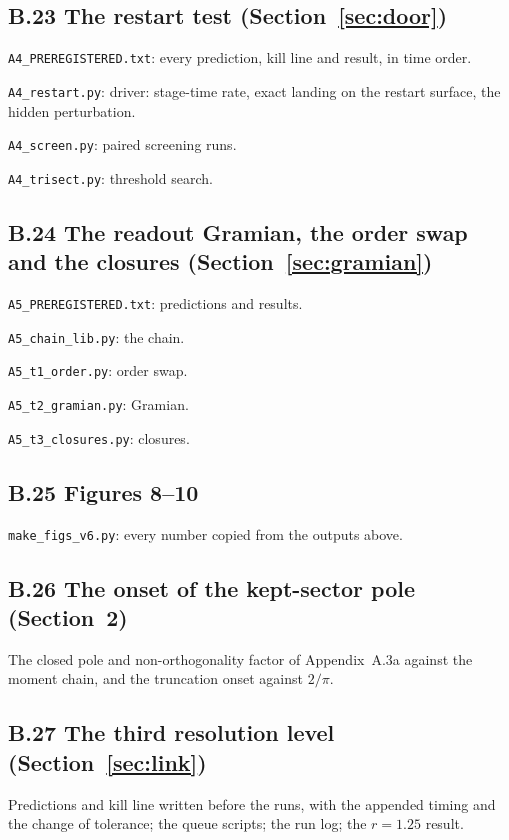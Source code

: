 \subsection*{B.23 The restart test (Section~\ref{sec:door})}
\noindent\texttt{A4\_PREREGISTERED.txt}: every prediction, kill line and result, in time order.

\noindent\texttt{A4\_restart.py}: driver: stage-time rate, exact landing on the restart surface, the hidden perturbation.

\noindent\texttt{A4\_screen.py}: paired screening runs.

\noindent\texttt{A4\_trisect.py}: threshold search.

\subsection*{B.24 The readout Gramian, the order swap and the closures (Section~\ref{sec:gramian})}
\noindent\texttt{A5\_PREREGISTERED.txt}: predictions and results.

\noindent\texttt{A5\_chain\_lib.py}: the chain.

\noindent\texttt{A5\_t1\_order.py}: order swap.

\noindent\texttt{A5\_t2\_gramian.py}: Gramian.

\noindent\texttt{A5\_t3\_closures.py}: closures.

\subsection*{B.25 Figures 8--10}
\noindent\texttt{make\_figs\_v6.py}: every number copied from the outputs above.

\subsection*{B.26 The onset of the kept-sector pole (Section~2)}
The closed pole and non-orthogonality factor of Appendix~A.3a against the moment chain, and the truncation onset against $2/\pi$.



\subsection*{B.27 The third resolution level (Section~\ref{sec:link})}
Predictions and kill line written before the runs, with the appended timing and the change of tolerance; the queue scripts; the run log; the $r=1.25$ result.





